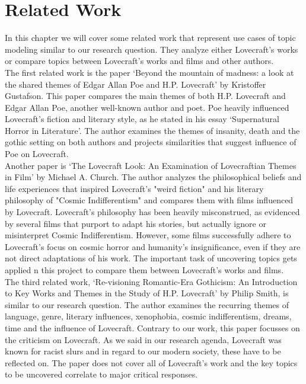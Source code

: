 \section{Related Work}

In this chapter we will cover some related work that represent use cases of topic modeling 
similar to our research question. They analyze either Lovecraft’s works or compare topics 
between Lovecraft’s works and films and other authors.\\

The first related work is the paper ‘Beyond the mountain of madness: a look at the shared 
themes of Edgar Allan Poe and H.P. Lovecraft’ by Kristoffer Gustafson. This paper compares 
the main themes of both H.P. Lovecraft and Edgar Allan Poe, another well-known author and 
poet. Poe heavily influenced Lovecraft’s fiction and literary style, as he stated in his 
essay ‘Supernatural Horror in Literature’. The author examines the themes of insanity, 
death and the gothic setting on both authors and projects similarities that suggest influence 
of Poe on Lovecraft.\\

Another paper is ‘The Lovecraft Look: An Examination of Lovecraftian Themes in Film’ by 
Michael A. Church. The author analyzes the philosophical beliefs and life experiences that 
inspired Lovecraft's "weird fiction" and his literary philosophy of "Cosmic Indifferentism" 
and compares them with films influenced by Lovecraft. Lovecraft's philosophy has been 
heavily misconstrued, as evidenced by several films that purport to adapt his stories, 
but actually ignore or misinterpret Cosmic Indifferentism. However, some films successfully 
adhere to Lovecraft's focus on cosmic horror and humanity's insignificance, even if they 
are not direct adaptations of his work. The important task of uncovering topics gets applied 
n this project to compare them between Lovecraft’s works and films.\\

The third related work, ‘Re-visioning Romantic-Era Gothicism: An Introduction to Key Works 
and Themes in the Study of H.P. Lovecraft’ by Philip Smith, is similar to our research 
question. The author examines the recurring themes of language, genre, literary influences, 
xenophobia, cosmic indifferentism, dreams, time and the influence of Lovecraft. Contrary 
to our work, this paper focusses on the criticism on Lovecraft. As we said in our research 
agenda, Lovecraft was known for racist slurs and in regard to our modern society, these 
have to be reflected on. The paper does not cover all of Lovecraft’s work and the key 
topics to be uncovered correlate to major critical responses.